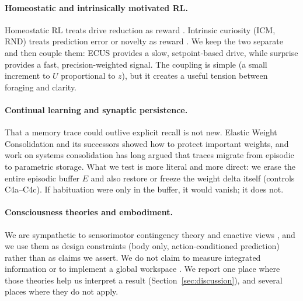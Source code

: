 \documentclass[11pt,a4paper]{article}
\begin{document}
\paragraph{Homeostatic and intrinsically motivated RL.} Homeostatic RL treats drive reduction as reward \cite{kernelan2014, man2016}. Intrinsic curiosity (ICM, RND) treats prediction error or novelty as reward \cite{pathak2017, burda2018}. We keep the two separate and then couple them: ECUS provides a slow, setpoint-based drive, while surprise provides a fast, precision-weighted signal. The coupling is simple (a small increment to $U$ proportional to $z$), but it creates a useful tension between foraging and clarity.

\paragraph{Continual learning and synaptic persistence.} That a memory trace could outlive explicit recall is not new. Elastic Weight Consolidation \cite{kirkpatrick2017} and its successors showed how to protect important weights, and work on systems consolidation has long argued that traces migrate from episodic to parametric storage. What we test is more literal and more direct: we erase the entire episodic buffer $E$ and also restore or freeze the weight delta itself (controls C4a--C4c). If habituation were only in the buffer, it would vanish; it does not.

\paragraph{Consciousness theories and embodiment.} We are sympathetic to sensorimotor contingency theory \cite{oregan2001} and enactive views \cite{thompson2007}, and we use them as design constraints (body only, action-conditioned prediction) rather than as claims we assert. We do not claim to measure integrated information \cite{tononi2014} or to implement a global workspace \cite{baars1988, dehaene2011}. We report one place where those theories help us interpret a result (Section~\ref{sec:discussion}), and several places where they do not apply.
\end{document}
